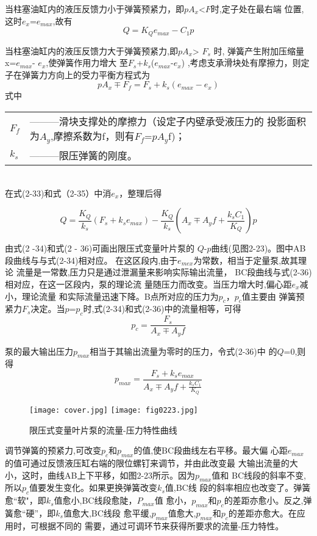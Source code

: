 当柱塞油缸内的液压反馈力小于弹簧预紧力，即$p$$A_x$<$F$时,定子处在最右端
位置,这时$e_x$=$e_{max}$,故有
\begin{equation*}
    Q=K_Qe_{max}-C_1p
\end{equation*}

当柱塞油缸内的液压反馈力大于弹簧预紧力,即$p$$A_x$> $F_s$ 时,
弹簧产生附加压缩量x=$e_{max }$- $e_x$,使弹簧作用力增大
至$F_s$+$k_s$($e_{max}$-$e_x$)
,考虑支承滑块处有摩擦力，则定子在弹簧力方向上的受力平衡方程式为
\begin{equation*}
   pA_x\mp F_f=F_s+k_s(e_{max}-e_x)
\end{equation*}
式中
\begin{tabular}[t]{ll}
    $F_f$&———滑块支撑处的摩擦力（设定子内壁承受液压力的
    投影面积为$A_y$,摩擦系数为f，则有$F_f$=$p$$A_y$f)；\\
    $k_s$&———限压弹簧的刚度。
\end{tabular}\\
在式(2-33)和式（2-35）中消$e_x$，整理后得

\begin{equation*}
   Q=\frac{K_Q}{k_s}(F_s+k_se_{max})-\frac{K_Q}{k_s}(A_x\mp A_yf+\frac{k_sC_1}{K_Q})p
\end{equation*}

由式(2 -34)和式(2 - 36)可画出限压式变量叶片泵的
$Q$-$p$曲线(见图2-23)。图中AB段曲线与与式(2-34)相对应。
在这区段内,由于$e_{mex}$为常数，相当于定量泵,故其理论
流量是一常数,压力只是通过泄漏量来影响实际输出流量，
BC段曲线与式(2-36)相对应，在这一区段内，泵的理论流
量随压力而改变。当压力增大时,偏心距$e_x$减小，理论流量
和实际流量迅速下降。B点所对应的压力为$p_c$，$p_c$值主要由
弹簧预紧力$F_s$决定。当$p$=$p_c$时,式(2-34)和式(2-36)中的流量相等，可得
\begin{equation*}
    p_c=\frac{F_s}{A_x\mp A_yf}
\end{equation*}

泵的最大输出压力$p_{max}$相当于其输出流量为零时的压力，令式(2-36)中
的$Q$=0,则得
\begin{equation*}
p_{max}=\frac{F_s+k_se_{max}}{A_x\mp A_yf+\frac{k_sC_1}{K_Q}}
\end{equation*}
\begin{figure} [htbp]
    \centering
    \ifOpenSource
    \texttt{[image: cover.jpg]}
    \else
    \texttt{[image: fig0223.jpg]}
    \fi
    \caption{限压式变量叶片泵的流量-压力特性曲线} 
    \label{fig:fig0223}
\end{figure}

调节弹簧的预紧力,可改变$p_c$和$p_{max}$的值,使BC段曲线左右平移。最大偏
心距$e_{max}$的值可通过反馈液压缸右端的限位螺钉来调节，并由此改变最
大输出流量的大小，这时，曲线AB上下平移，如图2-23所示。因为$p_{max}$值和
BC线段的斜率不变,所以$p_c$值要发生变化。如果更换弹簧改变$k_s$值,BC线
段的斜率相应也改变了。弹簧愈“软"，即$k_s$值愈小,BC线段愈陡，$P_{max}$值
愈小，$p_{max}$和$p_c$的差距亦愈小。反之,弹簧愈“硬”，即$k_s$值愈大,BC线段
愈平缓,$p_{max}$值愈大,$p_{max}$和$p_c$的差距亦愈大。在应用时，可根据不同的
需要，通过可调环节来获得所要求的流量-压力特性。

